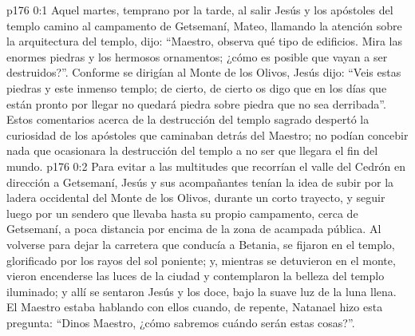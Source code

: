 \author{Comisión de seres intermedios}
\vs p176 0:1 Aquel martes, temprano por la tarde, al salir Jesús y los apóstoles del templo camino al campamento de Getsemaní, Mateo, llamando la atención sobre la arquitectura del templo, dijo: “Maestro, observa qué tipo de edificios. Mira las enormes piedras y los hermosos ornamentos; ¿cómo es posible que vayan a ser destruidos?”. Conforme se dirigían al Monte de los Olivos, Jesús dijo: “Veis estas piedras y este inmenso templo; de cierto, de cierto os digo que en los días que están pronto por llegar no quedará piedra sobre piedra que no sea derribada”. Estos comentarios acerca de la destrucción del templo sagrado despertó la curiosidad de los apóstoles que caminaban detrás del Maestro; no podían concebir nada que ocasionara la destrucción del templo a no ser que llegara el fin del mundo.
\vs p176 0:2 Para evitar a las multitudes que recorrían el valle del Cedrón en dirección a Getsemaní, Jesús y sus acompañantes tenían la idea de subir por la ladera occidental del Monte de los Olivos, durante un corto trayecto, y seguir luego por un sendero que llevaba hasta su propio campamento, cerca de Getsemaní, a poca distancia por encima de la zona de acampada pública. Al volverse para dejar la carretera que conducía a Betania, se fijaron en el templo, glorificado por los rayos del sol poniente; y, mientras se detuvieron en el monte, vieron encenderse las luces de la ciudad y contemplaron la belleza del templo iluminado; y allí se sentaron Jesús y los doce, bajo la suave luz de la luna llena. El Maestro estaba hablando con ellos cuando, de repente, Natanael hizo esta pregunta: “Dinos Maestro, ¿cómo sabremos cuándo serán estas cosas?”.
